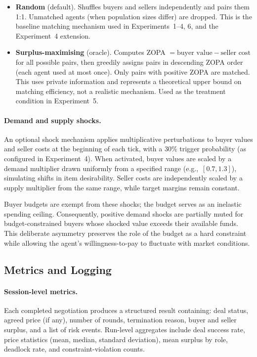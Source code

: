 \begin{itemize}
    \item \textbf{Random} (default).  Shuffles buyers and sellers independently and pairs them 1:1.  Unmatched agents (when population sizes differ) are dropped.  This is the baseline matching mechanism used in Experiments~1--4, 6, and the Experiment~4 extension.
    \item \textbf{Surplus-maximising} (oracle).  Computes ZOPA $= \text{buyer value} - \text{seller cost}$ for all possible pairs, then greedily assigns pairs in descending ZOPA order (each agent used at most once).  Only pairs with positive ZOPA are matched.  This uses private information and represents a theoretical upper bound on matching efficiency, not a realistic mechanism.  Used as the treatment condition in Experiment~5.
\end{itemize}

\paragraph{Demand and supply shocks.}
\label{sec:shocks}
An optional shock mechanism applies multiplicative perturbations to buyer values and seller costs at the beginning of each tick, with a 30\% trigger probability (as configured in Experiment~4). When activated, buyer values are scaled by a demand multiplier drawn uniformly from a specified range (e.g.,\ $[0.7, 1.3]$), simulating shifts in item desirability. Seller costs are independently scaled by a supply multiplier from the same range, while target margins remain constant. 

Buyer budgets are exempt from these shocks; the budget serves as an inelastic spending ceiling. Consequently, positive demand shocks are partially muted for budget-constrained buyers whose shocked value exceeds their available funds. This deliberate asymmetry preserves the role of the budget as a hard constraint while allowing the agent's willingness-to-pay to fluctuate with market conditions.

\subsection{Metrics and Logging}
\label{sec:metrics}

\paragraph{Session-level metrics.}
Each completed negotiation produces a structured result containing: deal status, agreed price (if any), number of rounds, termination reason, buyer and seller surplus, and a list of risk events.  Run-level aggregates include deal success rate, price statistics (mean, median, standard deviation), mean surplus by role, deadlock rate, and constraint-violation counts.

